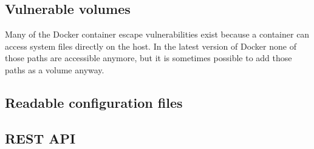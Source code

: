 \subsection{Vulnerable volumes}
Many of the Docker container escape vulnerabilities exist because a container can access system files directly on the host. In the latest version of Docker none of those paths are accessible anymore, but it is sometimes possible to add those paths as a volume anyway.

\subsection{Readable configuration files}

\subsection{REST API}
